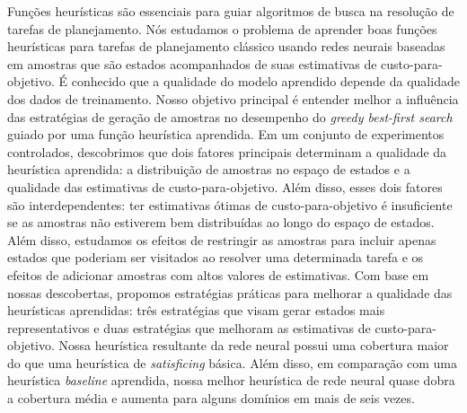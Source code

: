 \begin{translatedabstract}
Funções heurísticas são essenciais para guiar algoritmos de busca na resolução de tarefas de planejamento.
Nós estudamos o problema de aprender boas funções heurísticas para tarefas de planejamento clássico usando redes neurais baseadas em amostras que são estados acompanhados de suas estimativas de custo-para-objetivo. É conhecido que a qualidade do modelo aprendido depende da qualidade dos dados de treinamento. Nosso objetivo principal é entender melhor a influência das estratégias de geração de amostras no desempenho do \emph{greedy best-first search} guiado por uma função heurística aprendida.
Em um conjunto de experimentos controlados, descobrimos que dois fatores principais determinam a qualidade da heurística aprendida: a distribuição de amostras no espaço de estados e a qualidade das estimativas de custo-para-objetivo. Além disso, esses dois fatores são interdependentes: ter estimativas ótimas de custo-para-objetivo é insuficiente se as amostras não estiverem bem distribuídas ao longo do espaço de estados.
Além disso, estudamos os efeitos de restringir as amostras para incluir apenas estados que poderiam ser visitados ao resolver uma determinada tarefa e os efeitos de adicionar amostras com altos valores de estimativas.
Com base em nossas descobertas, propomos estratégias práticas para melhorar a qualidade das heurísticas aprendidas: três estratégias que visam gerar estados mais representativos e duas estratégias que melhoram as estimativas de custo-para-objetivo.
Nossa heurística resultante da rede neural possui uma cobertura maior do que uma heurística de \emph{satisficing} básica. Além disso, em comparação com uma heurística \emph{baseline} aprendida, nossa melhor heurística de rede neural quase dobra a cobertura média e aumenta para alguns domínios em mais de seis vezes.
\end{translatedabstract}
